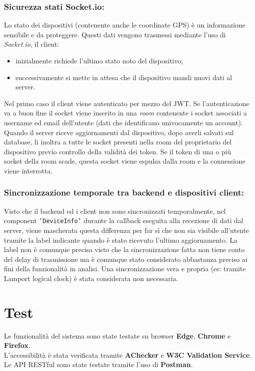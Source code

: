 \documentclass{report}
\begin{document}
\subsubsection{Sicurezza stati Socket.io:}
Lo stato dei dispositivi (contenente anche le coordinate GPS) è un informazione sensibile e da proteggere. Questi dati vengono trasmessi mediante l'uso di \textit{Socket.io}, il client:
\begin{itemize}
    \item inizialmente richiede l'ultimo stato noto del dispositivo;
    \item successivamente si mette in attesa che il dispositivo mandi nuovi dati al server.
\end{itemize}
Nel primo caso il client viene autenticato per mezzo del JWT. Se l'autenticazione va a buon fine il socket viene inserito in una \textit{room} contenente i socket associati a username ed email dell'utente (dati che identificano univocamente un account).\\
Quando il server riceve aggiornamenti dal dispositivo, dopo averli salvati sul database, li inoltra a tutte le socket presenti nella room del proprietario del dispositivo previo controllo della validità dei token. Se il token di una o più socket della room scade, questa socket viene espulsa dalla room e la connessione viene interrotta.\\
\subsubsection{Sincronizzazione temporale tra backend e dispositivi client:}
Visto che il backend ed i client non sono sincronizzati temporalmente, nel component  \texttt{'DeviceInfo'} durante la callback eseguita alla recezione di dati dal server,  viene mascherata questa differenza per far sì che non sia visibile all'utente tramite la label indicante quando è stato ricevuto l'ultimo aggiornamento. La label non è comunque precisa visto che la sincronizzazione fatta non tiene conto del delay di trasmissione ma è comunque stato considerato abbastanza preciso ai fini della funzionalità in analisi. Una sincronizzazione vera e propria (es: tramite Lamport logical clock) è stata considerata non necessaria.


\section{Test}
Le funzionalità del sistema sono state testate su browser \textbf{Edge}, \textbf{Chrome} e \textbf{Firefox}.\\
L'accessibilità è stata verificata tramite \textbf{AChecker} e \textbf{W3C Validation Service}.\\
Le API RESTful sono state testate tramite l'uso di \textbf{Postman}.
\end{document}
